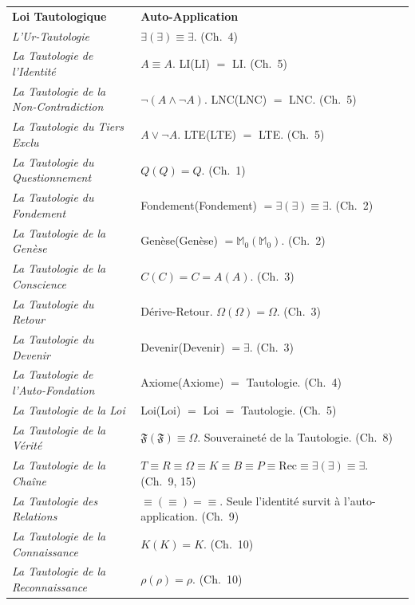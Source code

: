 \documentclass[10pt, openany, oneside]{book}
\renewcommand{\footnotesize}{\fontsize{8.5}{11}\selectfont}
\begin{document}
{\footnotesize
\noindent\begin{tabular}{@{} p{} @{\hspace{0.5em}} p{} @{}}
\textbf{Loi Tautologique} & \textbf{Auto-Application} \\[0.5em]
\textit{L'Ur-Tautologie} & $\exists(\exists) \equiv \exists$. (Ch.\ 4) \\[0.3em]
\textit{La Tautologie de l'Identité} & $A \equiv A$. LI(LI) $=$ LI. (Ch.\ 5) \\[0.3em]
\textit{La Tautologie de la Non-Contradiction} & $\neg(A \wedge \neg A)$. LNC(LNC) $=$ LNC. (Ch.\ 5) \\[0.3em]
\textit{La Tautologie du Tiers Exclu} & $A \vee \neg A$. LTE(LTE) $=$ LTE. (Ch.\ 5) \\[0.3em]
\textit{La Tautologie du Questionnement} & $Q(Q) = Q$. (Ch.\ 1) \\[0.3em]
\textit{La Tautologie du Fondement} & Fondement(Fondement) $= \exists(\exists) \equiv \exists$. (Ch.\ 2) \\[0.3em]
\textit{La Tautologie de la Genèse} & Genèse(Genèse) $= \mathbb{M}_0(\mathbb{M}_0)$. (Ch.\ 2) \\[0.3em]
\textit{La Tautologie de la Conscience} & $C(C) = C = A(A)$. (Ch.\ 3) \\[0.3em]
\textit{La Tautologie du Retour} & Dérive-Retour. $\Omega(\Omega) = \Omega$. (Ch.\ 3) \\[0.3em]
\textit{La Tautologie du Devenir} & Devenir(Devenir) $= \exists$. (Ch.\ 3) \\[0.3em]
\textit{La Tautologie de l'Auto-Fondation} & Axiome(Axiome) $=$ Tautologie. (Ch.\ 4) \\[0.3em]
\textit{La Tautologie de la Loi} & Loi(Loi) $=$ Loi $=$ Tautologie. (Ch.\ 5) \\[0.3em]
\textit{La Tautologie de la Vérité} & $\mathfrak{F}(\mathfrak{F}) \equiv \Omega$. Souveraineté de la Tautologie. (Ch.\ 8) \\[0.3em]
\textit{La Tautologie de la Chaîne} & $T \equiv R \equiv \Omega \equiv K \equiv B \equiv P \equiv \text{Rec} \equiv \exists(\exists) \equiv \exists$. (Ch.\ 9, 15) \\[0.3em]
\textit{La Tautologie des Relations} & $\equiv(\equiv) = \equiv$. Seule l'identité survit à l'auto-application. (Ch.\ 9) \\[0.3em]
\textit{La Tautologie de la Connaissance} & $K(K) = K$. (Ch.\ 10) \\[0.3em]
\textit{La Tautologie de la Reconnaissance} & $\rho(\rho) = \rho$. (Ch.\ 10) \\[0.3em]

\end{tabular}}
\end{document}
